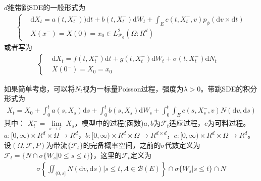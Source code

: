             \par
            $d$维带跳SDE的一般形式为
            \begin{align*}
                \left\{
                \begin{aligned}
                &\mathrm{d}X_t = a(t,X_t^-))\mathrm{d}t + b(t,X_t^-)\mathrm{d}W_t + \int_E c(t,X_t^-,v) p_\phi(\mathrm{d}v\times \mathrm{d}t)\\
                &X(x^-) = X(0) = x_0 \in L_{\mathcal{F}_0}^2(\Omega:R^d)
                \end{aligned}
                \right.
            \end{align*}
            或者写为
            \begin{align*}
            \left\{
                \begin{aligned}
                &\mathrm{d}X_t = f(t,X_t^-)\mathrm{d}t + g(t,X_t^-)\mathrm{d}W_t + \sigma(t,X_t^-)\mathrm{d}N_t\\
                &X(0^-) = X_0 = x_0&
                \end{aligned}
            \right.
            \end{align*}
            \par
            如果简单考虑，可以将$N_t$视为一标量Poisson过程，强度为$\lambda > 0$。带跳SDE的积分形式为
            \begin{align*}
                X_t = X_0 +\int_0^t a(s,X_s)\mathrm{d}s+\int_0^t b(s,X_s)\mathrm{d}W_s + \int_0^t \int_{E}c(s,X_s^-,v)N(\mathrm{d}v,\mathrm{d}s)
            \end{align*}
            其中：
            $X_t^- = \lim\limits_{s\rightarrow t^-}X_s$，模型中的过程(函数)$a,b$为$\mathcal{F}_t$适应过程，$c$为可料过程。\\
            $a:[0,\infty)\times R^d \times \Omega \rightarrow R^d$，$b:[0,\infty)\times R^d \times \Omega \rightarrow R^{d\times d}$，$c:[0,\infty)\times R^d \times \Omega \rightarrow R^{d}$。\\
            设$(\Omega,\mathcal{F},P)$为带流$\{\mathcal{F}_t\}$的完备概率空间，之前的$\sigma$代数定义为$\mathcal{F}_t = \{N \cap \sigma\{W_s|0 \leqslant s \leqslant t\}\}$，这里的$\mathcal{F}_t$定义为
            \begin{align*}
                \sigma\left\{\iint_{(0,s]}N(\mathrm{d}v,\mathrm{d}s)\biggl|s \leqslant t,A\in \mathcal{B}(E)\right\} \cap \sigma\{W_s|s \leqslant t\} \cap N
            \end{align*}
